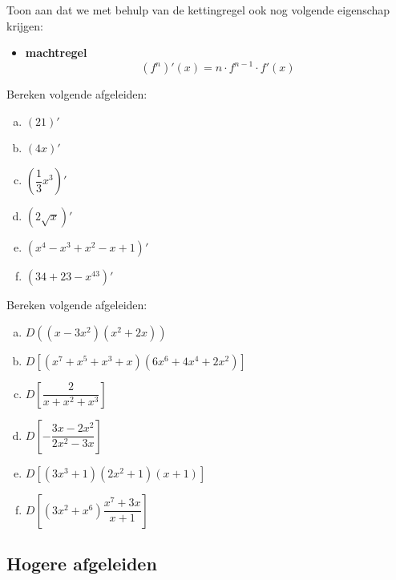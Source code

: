 \documentclass[12pt]{article}
\newenvironment{kader}
{
  \begin{mdframed}[nobreak=true]
  }{%
  \end{mdframed}
}
\begin{document}
\begin{oefening}
  Toon aan dat we met behulp van de kettingregel ook nog volgende eigenschap krijgen:
  \begin{kader}
    \begin{itemize}
    \item {\bf machtregel}
      $$(f^n)'(x)=n\cdot f^{n-1} \cdot f'(x)$$
    \end{itemize}
  \end{kader}
\end{oefening}

\begin{oefening}
  Bereken volgende afgeleiden:
  \begin{multicols}{2}
    \begin{enumerate}[(a)]
    \item $\left(21\right)'$
    \item $\left(4x\right)'$
    \item $\left(\dfrac{1}{3}x^3\right)'$
    \item $\left(2\sqrt{x}\right)'$
    \item $\left(x^4-x^3+x^2-x+1\right)'$
    \item $\left(34+23-x^{43}\right)'$
    \end{enumerate}
  \end{multicols}
\end{oefening}

\begin{oefening}
  Bereken volgende afgeleiden:
  \begin{multicols}{2}
  \begin{enumerate}[(a)]
  \itemsep1em
  \item $D\left((x-3x^2)(x^2+2x)\right)$
  \item $D\left[(x^7+x^5+x^3+x)(6x^6+4x^4+2x^2)\right]$
  \item $D\left[\dfrac{2}{x+x^2+x^3}\right]$
  \item $D\left[-\dfrac{3x-2x^2}{2x^2-3x}\right]$
  \item $D\left[(3x^3+1)(2x^2+1)(x+1)\right]$
  \item $D\left[(3x^2+x^6)\dfrac{x^7+3x}{x+1}\right]$
  \end{enumerate}
  \end{multicols}
\end{oefening}

\subsection{Hogere afgeleiden}
\end{document}

